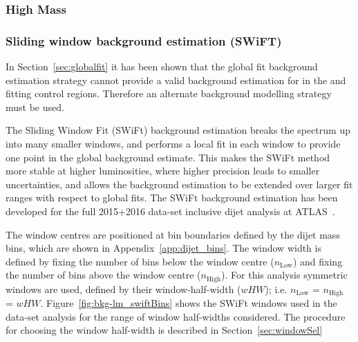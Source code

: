 \subsubsection{High Mass}
\label{sec:highmass_globalFit}

\subsubsection{Sliding window background estimation (SWiFT)}
\label{sec:swift}

In Section~\ref{sec:globalfit} it has been shown that the global fit background estimation strategy cannot provide a
valid background estimation for in the \hm{} and \lm{} fitting control regions.
Therefore an alternate background modelling strategy must be used.

The Sliding Window Fit (SWiFt) background estimation breaks the spectrum up into many smaller windows,
and performs a local fit in each window to provide one point in the global background \mjj{} estimate. 
This makes the SWiFt method more stable at higher luminosities, where higher precision leads to smaller uncertainties,
and allows the background estimation to be extended over larger fit ranges with respect to global fits.
The SWiFt background estimation has been developed for the full 2015+2016 data-set inclusive dijet analysis at ATLAS~\cite{dijet_mori17_paper}.

The window centres are positioned at bin boundaries defined by the dijet mass bins, which are shown in Appendix~\ref{app:dijet_bins}.
The window width is defined by fixing the number of bins below the window centre ($n_{\text{Low}}$)
and fixing the number of bins above the window centre ($n_{\text{High}}$).
For this analysis symmetric windows are used, defined by their window-half-width ($wHW$); i.e. $n_{\text{Low}}$ = $n_{\text{High}}$ = $wHW$.
Figure~\ref{fig:bkg-lm_swiftBins} shows the SWiFt windows used in the \lm{} data-set analysis for the range of window half-widths considered.
The procedure for choosing the window half-width is described in Section~\ref{sec:windowSel}

